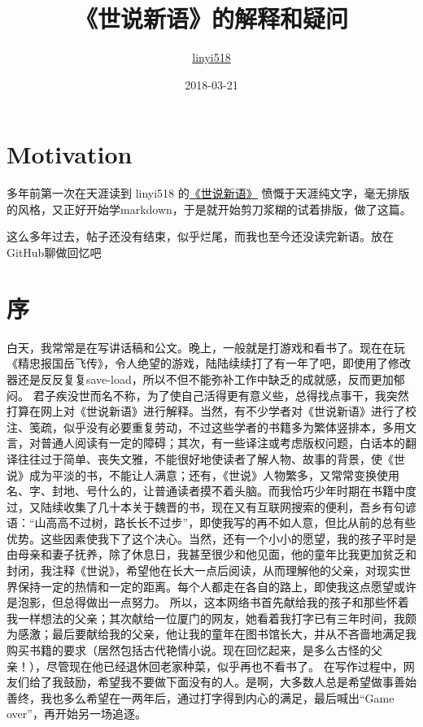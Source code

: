 \documentclass[]{book}
\title{《世说新语》的解释和疑问}
\author{\href{http://www.tianya.cn/1907780}{linyi518}}
\date{2018-03-21}
\begin{document}
\maketitle

{
\setcounter{tocdepth}{1}
\tableofcontents
}
\chapter*{Motivation}\label{motivation}

多年前第一次在天涯读到 linyi518
的\href{http://bbs.tianya.cn/post-books-108487-1.shtml}{《世说新语》}
愤慨于天涯纯文字，毫无排版的风格，又正好开始学markdown，于是就开始剪刀浆糊的试着排版，做了这篇。

这么多年过去，帖子还没有结束，似乎烂尾，而我也至今还没读完新语。放在GitHub聊做回忆吧

\chapter*{序}

白天，我常常是在写讲话稿和公文。晚上，一般就是打游戏和看书了。现在在玩《精忠报国岳飞传》，令人绝望的游戏，陆陆续续打了有一年了吧，即使用了修改器还是反反复复save-load，所以不但不能弥补工作中缺乏的成就感，反而更加郁闷。
君子疾没世而名不称，为了使自己活得更有意义些，总得找点事干，我突然打算在网上对《世说新语》进行解释。当然，有不少学者对《世说新语》进行了校注、笺疏，似乎没有必要重复劳动，不过这些学者的书籍多为繁体竖排本，多用文言，对普通人阅读有一定的障碍；其次，有一些译注或考虑版权问题，白话本的翻译往往过于简单、丧失文雅，不能很好地使读者了解人物、故事的背景，使《世说》成为平淡的书，不能让人满意；还有，《世说》人物繁多，又常常变换使用名、字、封地、号什么的，让普通读者摸不着头脑。而我恰巧少年时期在书籍中度过，又陆续收集了几十本关于魏晋的书，现在又有互联网搜索的便利，吾乡有句谚语：``山高高不过树，路长长不过步''，即使我写的再不如人意，但比从前的总有些优势。这些因素使我下了这个决心。当然，还有一个小小的愿望，我的孩子平时是由母亲和妻子抚养，除了休息日，我甚至很少和他见面，他的童年比我更加贫乏和封闭，我注释《世说》，希望他在长大一点后阅读，从而理解他的父亲，对现实世界保持一定的热情和一定的距离。每个人都走在各自的路上，即使我这点愿望或许是泡影，但总得做出一点努力。
所以，这本网络书首先献给我的孩子和那些怀着我一样想法的父亲；其次献给一位厦门的网友，她看着我打字已有三年时间，我颇为感激；最后要献给我的父亲，他让我的童年在图书馆长大，并从不吝啬地满足我购买书籍的要求（居然包括古代艳情小说。现在回忆起来，是多么古怪的父亲！），尽管现在他已经退休回老家种菜，似乎再也不看书了。
在写作过程中，网友们给了我鼓励，希望我不要做下面没有的人。是啊，大多数人总是希望做事善始善终，我也多么希望在一两年后，通过打字得到内心的满足，最后喊出``Game
over''，再开始另一场追逐。
\end{document}
